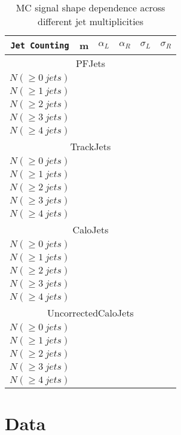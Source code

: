 \documentclass{cmspaper}
\begin{document}
\begin{table}[htdp]
   \caption{MC signal shape dependence across different jet multiplicities}
       \centering
       \begin{tabular}{|c|c|c|c|c|c|}
       \hline
       \verb|Jet Counting| & m & $\alpha_L$ & $\alpha_R$ & $\sigma_L$ & $\sigma_R$ \\
       \hline
       \multicolumn{6}{|c|}{PFJets} \\
       \hline
       $N(\geq 0~jets)$       &  \\
       $N(\geq 1~jets)$       & \\
       $N(\geq 2~jets)$       & \\
       $N(\geq 3~jets)$       & \\
       $N(\geq 4~jets)$       & \\
       \hline
       \multicolumn{6}{|c|}{TrackJets} \\
       \hline
       $N(\geq 0~jets)$       & \\
       $N(\geq 1~jets)$       & \\
       $N(\geq 2~jets)$       & \\
       $N(\geq 3~jets)$       & \\
       $N(\geq 4~jets)$       & \\
       \hline
       \multicolumn{6}{|c|}{CaloJets} \\
       \hline
       $N(\geq 0~jets)$       & \\
       $N(\geq 1~jets)$       & \\
       $N(\geq 2~jets)$       & \\
       $N(\geq 3~jets)$       & \\
       $N(\geq 4~jets)$       & \\
       \hline
       \multicolumn{6}{|c|}{UncorrectedCaloJets} \\
       \hline
       $N(\geq 0~jets)$       & \\
       $N(\geq 1~jets)$       & \\
       $N(\geq 2~jets)$       & \\
       $N(\geq 3~jets)$       & \\
       $N(\geq 4~jets)$       & \\
       \hline
       \end{tabular}
   \label{Table_MCSignalShape}
\end{table}

\section{Data}
\end{document}

